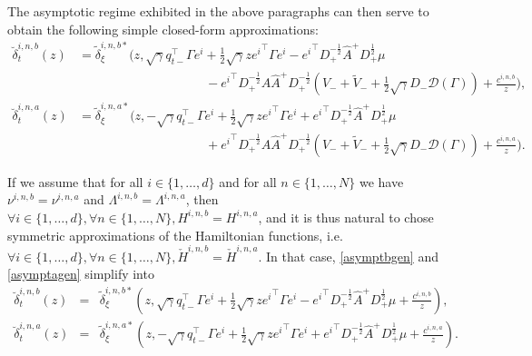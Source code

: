 \documentclass[preprint, 3p]{elsarticle}
\newcommand{\1}{{\chi}}
\begin{document}
The asymptotic regime exhibited in the above paragraphs can then serve to obtain the following simple closed-form approximations:
\begin{align}
	\breve\delta^{i,n,b}_t(z) &=\tilde{\delta}^{i,n,b*}_\xi \bigg( z,\sqrt\gamma q_{t-}^\intercal \Gamma e^i + \frac 12 \sqrt\gamma z {e^i}^\intercal \Gamma e^i - {e^i}^\intercal D_+^{-\frac 12} \widehat A^+ D_+^{\frac 12} \mu \label{asymptbgen}\\
	& \qquad \qquad \qquad \qquad \qquad - {e^i}^\intercal D_+^{-\frac 12}\widehat{A}\widehat{A}^+ D_+^{-\frac 12} \left(V_- + \tilde V_-
     + \frac{1}{2}\sqrt{\gamma}  D_- \mathcal D(\Gamma) \right) +\frac{c^{i,n,b}}{z} \bigg),\nonumber \\
	\breve\delta^{i,n,a}_t(z) &= \tilde{\delta}^{i,n,a*}_\xi \bigg( z,-\sqrt\gamma q_{t-}^\intercal \Gamma e^i + \frac 12 \sqrt\gamma z {e^i}^\intercal \Gamma e^i +  {e^i}^\intercal D_+^{-\frac 12} \widehat A^+ D_+^{\frac 12} \mu \label{asymptagen}\\
	& \qquad \qquad \qquad \qquad \qquad   +{e^i}^\intercal D_+^{-\frac 12}\widehat{A}\widehat{A}^+ D_+^{-\frac 12} \left(V_- + \tilde V_-
     + \frac{1}{2}\sqrt{\gamma}  D_- \mathcal D(\Gamma) \right) +\frac{c^{i,n,a}}{z} \bigg). \nonumber
	\end{align}

If we assume that for all $i \in \{1, \ldots, d\}$ and for all $n \in \{1,\ldots,N\}$ we have $\nu^{i,n,b} = \nu^{i,n,a}$ and $\Lambda^{i,n,b} = \Lambda^{i,n,a}$, then $\forall i \in \{1, \ldots, d\}, \forall n \in \{1,\ldots,N\}, H^{i,n,b} = H^{i,n,a}$, and it is thus natural to chose symmetric approximations of the Hamiltonian functions, i.e. $\forall i \in \{1, \ldots, d\}, \forall n \in \{1,\ldots,N\}, \check{H}^{i,n,b} = \check{H}^{i,n,a}$. In that case, \eqref{asymptbgen} and \eqref{asymptagen} simplify into
\begin{eqnarray}
	\breve\delta^{i,n,b}_t(z) &=& \tilde{\delta}^{i,n,b*}_\xi\left(z,\sqrt\gamma q_{t-}^\intercal \Gamma e^i + \frac 12 \sqrt\gamma z {e^i}^\intercal \Gamma e^i -   {e^i}^\intercal D_+^{-\frac 12} \widehat A^+ D_+^{\frac 12} \mu +\frac{c^{i,n,b}}{z} \right),\label{asymptbsymgen}\\
	\breve\delta^{i,n,a}_t(z) &=& \tilde{\delta}^{i,n,a*}_\xi\left(z,-\sqrt\gamma q_{t-}^\intercal \Gamma e^i + \frac 12 \sqrt\gamma z {e^i}^\intercal \Gamma e^i +  {e^i}^\intercal D_+^{-\frac 12} \widehat A^+ D_+^{\frac 12} \mu+\frac{c^{i,n,a}}{z} \right).\label{asymptasymgen}
	\end{eqnarray}
\end{document}

